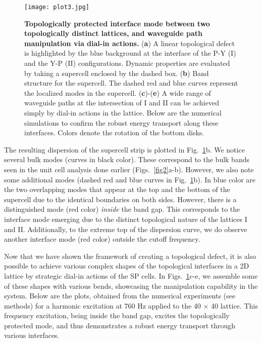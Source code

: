 \documentclass[aps,preprint,onecolumn,showpacs,superscriptaddress,groupedaddress]{revtex4}  %
\begin{document}
\begin{figure}[t]
\centering
\texttt{[image: plot3.jpg]}
\caption{\textbf{Topologically protected interface mode between two topologically distinct lattices, and waveguide path manipulation via dial-in actions.} (\textbf{a}) A linear topological defect is highlighted by the blue background at the interface of the P-Y (I) and the Y-P (II) configurations. Dynamic properties are evaluated by taking a supercell enclosed by the dashed box. (\textbf{b}) Band structure for the supercell. The dashed red and blue curves represent the localized modes in the supercell. (\textbf{c})-(\textbf{e}) A wide range of waveguide paths at the intersection of I and II can be achieved simply by dial-in actions in the lattice. Below are the numerical simulations to confirm the robust energy transport along these interfaces. Colors denote the rotation of the bottom disks.}
\label{fig3}
\end{figure} 


The resulting dispersion of the supercell strip is plotted in Fig.~\ref{fig3}b. We notice several bulk modes (curves in black color). These correspond to the bulk bands seen in the unit cell analysis done earlier (Figs.~\ref{fig2}a-b). However, we also note some additional modes (dashed red and blue curves in Fig.~\ref{fig3}b). In blue color are the two overlapping modes that appear at the top and the bottom of the supercell due to the identical boundaries on both sides. However, there is a distinguished mode (red color) \textit{inside} the band gap. This corresponds to the interface mode emerging due to the distinct topological nature of the lattices I and II. Additionally, to the extreme top of the dispersion curve, we do observe another interface mode (red color) outside the cutoff frequency. 

Now that we have shown the framework of creating a topological defect, it is also possible to achieve various complex shapes of the topological interfaces in a 2D lattice by strategic dial-in actions of the SP cells. In Figs.~\ref{fig3}c-e, we assemble some of these shapes with various bends, showcasing the manipulation capability in the system. Below are the plots, obtained from the numerical experiments (see methods) for a harmonic excitation at 760 Hz applied to the 40 $\times$ 40 lattice. This frequency excitation, being inside the band gap, excites the topologically protected mode, and thus demonstrates a robust energy transport through various interfaces.

\vspace{3ex}
\end{document}
